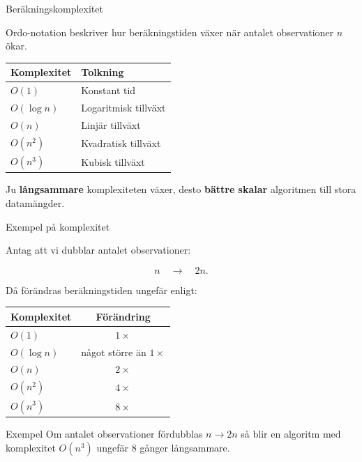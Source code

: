 \documentclass[10pt,english]{beamer}
\begin{document}
\begin{frame}{Beräkningskomplexitet}

    Ordo-notation beskriver hur beräkningstiden växer när antalet
    observationer \(n\) ökar.

    \medskip

    \begin{center}
        \begin{tabular}{ll}
            \toprule
            Komplexitet & Tolkning \\
            \midrule
            \(O(1)\)     & Konstant tid \\
            \(O(\log n)\)& Logaritmisk tillväxt \\
            \(O(n)\)     & Linjär tillväxt \\
            \(O(n^2)\)   & Kvadratisk tillväxt \\
            \(O(n^3)\)   & Kubisk tillväxt \\
            \bottomrule
        \end{tabular}
    \end{center}

    \medskip

    Ju \textbf{långsammare} komplexiteten växer, desto \textbf{bättre skalar}
    algoritmen till stora datamängder.

\end{frame}

\begin{frame}{Exempel på komplexitet}

    Antag att vi dubblar antalet observationer:

    \[
        n
        \quad \longrightarrow \quad
        2n.
    \]

    Då förändras beräkningstiden ungefär enligt:

    \begin{center}
        \begin{tabular}{lc}
            \toprule
            Komplexitet & Förändring \\
            \midrule
            \(O(1)\)      & \(1\times\) \\
            \(O(\log n)\) & något större än \(1\times\) \\
            \(O(n)\)      & \(2\times\) \\
            \(O(n^2)\)    & \(4\times\) \\
            \(O(n^3)\)    & \(8\times\) \\
            \bottomrule
        \end{tabular}
    \end{center}

\begin{block}{Exempel}
Om antalet observationer fördubblas $n \rightarrow 2n$
så blir en algoritm med komplexitet \(O(n^3)\)
ungefär \(8\) gånger långsammare.
\end{block}

\end{frame}
\end{document}
